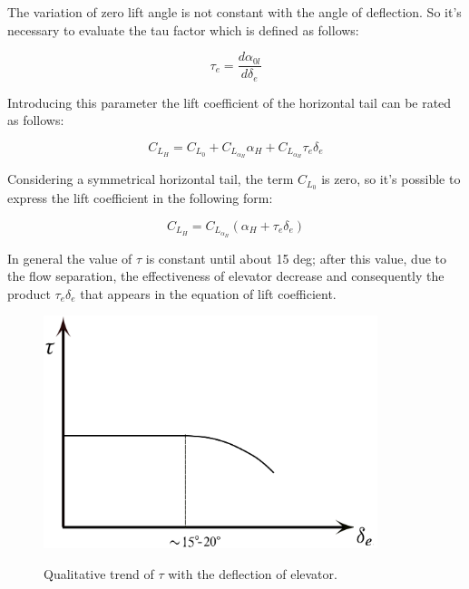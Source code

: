 The variation of zero lift angle is not constant with the angle of deflection. So it's necessary to evaluate the tau factor which is defined as follows:

\begin{equation}		 
\tau_e = \frac{d \alpha_{0l}}{d \delta_e}
\end{equation}

		
Introducing this parameter the lift coefficient of the horizontal tail can be rated as follows:

\begin{equation}
C_{L_H}= C_{L_0} + C_{L_{{\alpha}_H}} \alpha_H + 	C_{L_{{\alpha}_H}} \tau_e \delta_e
\end{equation}

  
Considering a symmetrical horizontal tail, the term $C_{L_0}$ is zero, so it's possible to express the lift coefficient in the following form:


\begin{equation}
C_{L_H}= C_{L_{{\alpha}_H}} \left ( \alpha_H + \tau_e \delta_e \right)
\end{equation}
  		
 In general the value of $\tau$ is constant until about 15 deg; after this value, due to the flow separation, the effectiveness of elevator decrease and consequently the product $ \tau_e \delta_e$ that appears in the equation of lift coefficient.
		


\begin{figure}[H]
\centering
{\includegraphics[height=6.79cm]{Immagini/taude.png}} 
\label{tau1}
\caption{Qualitative trend of $\tau$ with the deflection of elevator.}
\end{figure} 		


